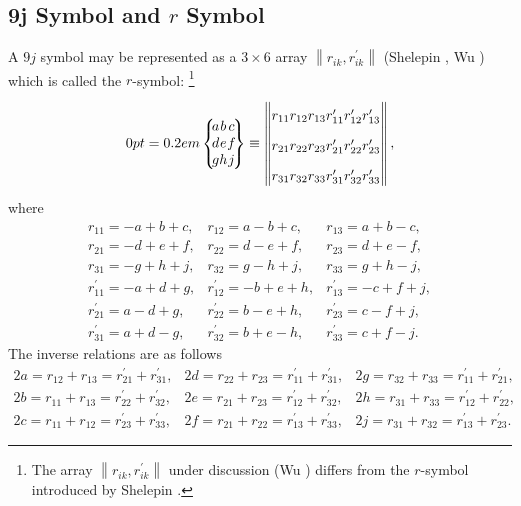 \subsection{9j Symbol and $r$ Symbol}\label{sec:10.1.2}
A $9 j$ symbol may be represented as a $3 \times 6$ array $\left\|r_{i k}, r_{i k}^{\prime}\right\|$ (Shelepin \cite{ref105}, Wu \cite{ref111}) which is called the $r$-symbol: \footnote{The array $\left\|r_{i k}, r_{i k}^{\prime}\right\|$ under discussion (Wu \cite{ref111}) differs from the $r$-symbol introduced by Shelepin \cite{ref105}.
}
\begin{equation}
\ninej{a}{b}{c}{d}{e}{f}{g}{h}{j} \label{eq:10:1:11}\equiv
\begin{Vmatrix}
r_{11} & r_{12} & r_{13} & r_{11}^{\prime} & r_{12}^{\prime} & r_{13}^{\prime} \\
r_{21} & r_{22} & r_{23} & r_{21}^{\prime} & r_{22}^{\prime} & r_{23}^{\prime} \\
r_{31} & r_{32} & r_{33} & r_{31}^{\prime} & r_{32}^{\prime} & r_{33}^{\prime}
\end{Vmatrix},
\end{equation}
where
\begin{equation}
\begin{array}{lll}
r_{11}=-a+b+c, & r_{12}=a-b+c, & r_{13}=a+b-c, \\
r_{21}=-d+e+f, & r_{22}=d-e+f, & r_{23}=d+e-f, \\
r_{31}=-g+h+j, & r_{32}=g-h+j, & r_{33}=g+h-j, \\
r_{11}^{\prime}=-a+d+g, & r_{12}^{\prime}=-b+e+h, & r_{13}^{\prime}=-c+f+j, \\
r_{21}^{\prime}=a-d+g, & r_{22}^{\prime}=b-e+h, & r_{23}^{\prime}=c-f+j, \\
r_{31}^{\prime}=a+d-g, & r_{32}^{\prime}=b+e-h, & r_{33}^{\prime}=c+f-j . \label{eq:10:1:12}
\end{array}
\end{equation}
The inverse relations are as follows
\begin{equation}
\begin{array}{lll}
2 a=r_{12}+r_{13}=r_{21}^{\prime}+r_{31}^{\prime}, & 2 d=r_{22}+r_{23}=r_{11}^{\prime}+r_{31}^{\prime}, & 2 g=r_{32}+r_{33}=r_{11}^{\prime}+r_{21}^{\prime}, \\
2 b=r_{11}+r_{13}=r_{22}^{\prime}+r_{32}^{\prime}, & 2 e=r_{21}+r_{23}=r_{12}^{\prime}+r_{32}^{\prime}, & 2 h=r_{31}+r_{33}=r_{12}^{\prime}+r_{22}^{\prime}, \\
2 c=r_{11}+r_{12}=r_{23}^{\prime}+r_{33}^{\prime}, & 2 f=r_{21}+r_{22}=r_{13}^{\prime}+r_{33}^{\prime}, & 2 j=r_{31}+r_{32}=r_{13}^{\prime}+r_{23}^{\prime} . \label{eq:10:1:13}
\end{array}
\end{equation}

